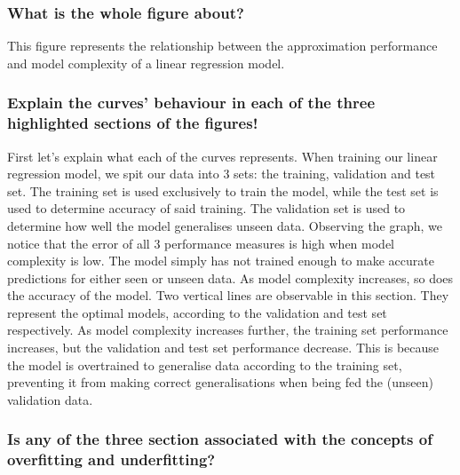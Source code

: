 \documentclass[12pt,a4paper]{article}
\begin{document}
\subsubsection*{What is the whole figure about?}

This figure represents the relationship between the approximation performance and model complexity of a linear regression model.

\subsubsection*{Explain the curves' behaviour in each of the three highlighted sections of the figures!}

First let's explain what each of the curves represents. When training our linear regression model, we spit our data into 3 sets: the training, validation and test set. The training set is used exclusively to train the model, while the test set is used to determine accuracy of said training. The validation set is used to determine how well the model generalises unseen data. Observing the graph, we notice that the error of all 3 performance measures is high when model complexity is low. The model simply has not trained enough to make accurate predictions for either seen or unseen data. 
\newpage
As model complexity increases, so does the accuracy of the model. Two vertical lines are observable in this section. They represent the optimal models, according to the validation and test set respectively. As model complexity increases further, the training set performance increases, but the validation and test set performance decrease. This is because the model is overtrained to generalise data according to the training set, preventing it from making correct generalisations when being fed the (unseen) validation data.

\subsubsection*{Is any of the three section associated with the concepts of overfitting and underfitting?}
\end{document}
